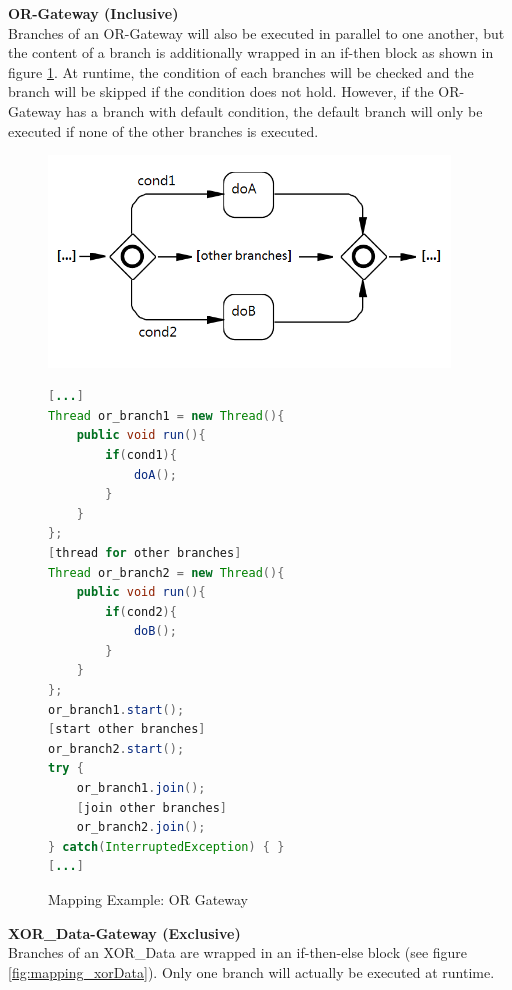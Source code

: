 \textbf{OR-Gateway (Inclusive)}\\
Branches of an OR-Gateway will also be executed in parallel to one another, but the content of a branch is additionally wrapped in an if-then block as shown in figure \ref{fig:mapping_OR}. At runtime, the condition of each branches will be checked and the branch will be skipped if the condition does not hold. However, if the OR-Gateway has a branch with default condition, the default branch will only be executed if none of the other branches is executed.
\begin{figure}[h]
\begin{minipage}[c]{0.5\textwidth}
\includegraphics[width=0.95\textwidth]{images/mapping/or-gateway.png}
\end{minipage}
\begin{minipage}[c]{0.5\textwidth}
\begin{lstlisting}[language=Java]
[...]
Thread or_branch1 = new Thread(){
	public void run(){
		if(cond1){
			doA();
		}
	}
};
[thread for other branches]
Thread or_branch2 = new Thread(){
	public void run(){
		if(cond2){
			doB();
		}
	}
};
or_branch1.start();
[start other branches]
or_branch2.start();
try {
	or_branch1.join();
	[join other branches]
	or_branch2.join();
} catch(InterruptedException) { }
[...]
\end{lstlisting}
\end{minipage}
\caption{Mapping Example: OR Gateway}%
\label{fig:mapping_OR}%
\end{figure}


\textbf{XOR\_Data-Gateway (Exclusive)}\\
Branches of an XOR\_Data are wrapped in an if-then-else block (see figure \ref{fig:mapping_xorData}). Only one branch will actually be executed at runtime. \\

